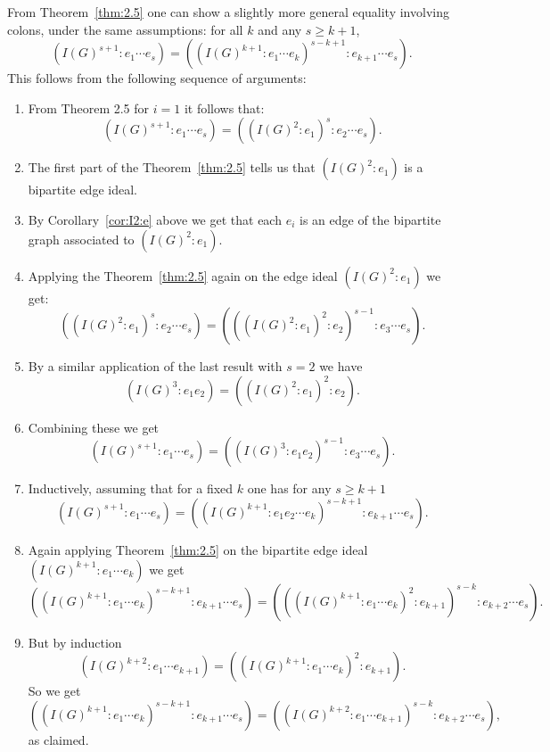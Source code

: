 \documentclass[ALCO,published]{cedram}
\numberwithin{equation}{section}
\begin{document}
\begin{rema} From Theorem~\ref{thm:2.5} one can show a slightly more general equality  involving colons, under the same assumptions: for all $k$ and any $s \geq k+1$,
\begin{equation*}
(I(G)^{s+1}:e_1\cdots e_s)=((I(G)^{k+1}:e_1 \cdots e_k)^{s-k+1} : e_{k+1} \cdots e_s).
\end{equation*}
This follows from the following sequence of arguments:
\begin{enumerate}[align=parleft,left=0pt,label=(\alph*)]
\item From Theorem 2.5 for $i=1$ it follows that:
\begin{equation*}
  (I(G)^{s+1}:e_1\cdots e_s)=((I(G)^2:e_1)^s : e_2 \cdots e_s ).
\end{equation*}

 \item The first part of the Theorem~\ref{thm:2.5} tells us that $(I(G)^2:e_1)$ is a bipartite edge ideal. 
  \item By Corollary~\ref{cor:I2:e} above we get that each $e_i$ is an edge of the bipartite graph associated to $(I(G)^2:e_1)$.
  \item Applying the Theorem~\ref{thm:2.5} again on the edge ideal $(I(G)^2:e_1)$ we get:
 \begin{equation*}
 ((I(G)^2:e_1)^s : e_2 \cdots e_s )=(((I(G)^2:e_1)^2:e_2)^{s-1} : e_3 \cdots e_s).
 \end{equation*}
\item By a similar application of the last result with $s=2$ we have
  \begin{equation*}
  (I(G)^3:e_1e_2)=((I(G)^2:e_1)^2:e_2).
  \end{equation*}

\item Combining these we get
\begin{equation*}
 (I(G)^{s+1}:e_1\cdots e_s)=((I(G)^3:e_1e_2)^{s-1} : e_3 \cdots e_s).
 \end{equation*}

\item Inductively, assuming that for a fixed $k$ one has for any $s \geq k+1$
\begin{equation*}
(I(G)^{s+1}:e_1\cdots e_s)=((I(G)^{k+1}:e_1e_2 \cdots e_k)^{s-k+1} : e_{k+1} \cdots e_s).
\end{equation*}
\item Again applying Theorem~\ref{thm:2.5} on the bipartite edge ideal $(I(G)^{k+1}:e_1 \cdots e_k)$ we get
 \begin{equation*}
 ((I(G)^{k+1} :e_1 \cdots e_k)^{s-k+1} :e_{k+1} \cdots e_s)=( ((I(G)^{k+1}: e_1 \cdots e_k )^2:e_{k+1})^{s-k} : e_{k+2} \cdots e_s).
\end{equation*}
\item But by induction $$(I(G)^{k+2}:e_1 \cdots e_{k+1})=((I(G)^{k+1}: e_1 \cdots e_k )^2:e_{k+1}).$$
  So we get $$((I(G)^{k+1} :e_1 \cdots e_k)^{s-k+1} :e_{k+1} \cdots e_s)= ((I(G)^{k+2}:e_1 \cdots e_{k+1})^{s-k}:e_{k+2} \cdots e_s),$$ as claimed.
\end{enumerate}
\end{rema}
\end{document}
